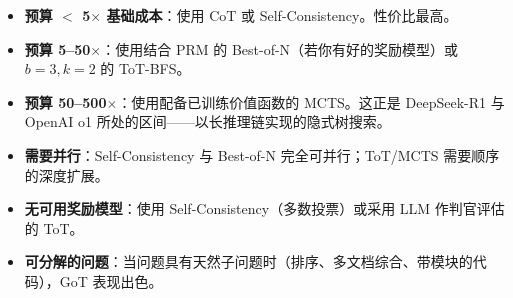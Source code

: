 \begin{keybox}[何时选用哪种方法]
\begin{itemize}
  \item \textbf{预算 $<$ 5$\times$ 基础成本}：使用 CoT 或 Self-Consistency。性价比最高。
  \item \textbf{预算 5--50$\times$}：使用结合 PRM 的 Best-of-N（若你有好的奖励模型）或 $b=3, k=2$ 的 ToT-BFS。
  \item \textbf{预算 50--500$\times$}：使用配备已训练价值函数的 MCTS。这正是 DeepSeek-R1 与 OpenAI o1 所处的区间——以长推理链实现的隐式树搜索。
  \item \textbf{需要并行}：Self-Consistency 与 Best-of-N 完全可并行；ToT/MCTS 需要顺序的深度扩展。
  \item \textbf{无可用奖励模型}：使用 Self-Consistency（多数投票）或采用 LLM 作判官评估的 ToT。
  \item \textbf{可分解的问题}：当问题具有天然子问题时（排序、多文档综合、带模块的代码），GoT 表现出色。
\end{itemize}
\end{keybox}

